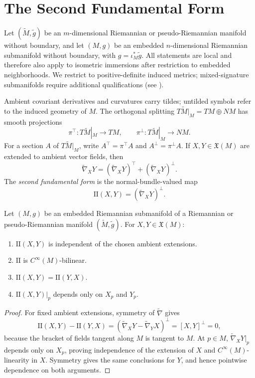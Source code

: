 \section{The Second Fundamental Form}

Let $(\widetilde M,\widetilde g)$ be an $m$-dimensional Riemannian or
pseudo-Riemannian manifold without boundary, and let $(M,g)$ be an embedded
$n$-dimensional Riemannian submanifold without boundary, with
$g=\iota_M^*\widetilde g$. All statements are local and therefore also apply
to isometric immersions after restriction to embedded neighborhoods. We
restrict to positive-definite induced metrics; mixed-signature submanifolds
require additional qualifications (see \cite{dC92}).

Ambient covariant derivatives and curvatures carry tildes; untilded symbols
refer to the induced geometry of $M$. The orthogonal splitting
$T\widetilde M|_M=TM\oplus NM$ has smooth projections
\[
\pi^\top:T\widetilde M|_M\to TM,
\qquad
\pi^\perp:T\widetilde M|_M\to NM.
\]
For a section $A$ of $T\widetilde M|_M$, write
$A^\top=\pi^\top A$ and $A^\perp=\pi^\perp A$. If
$X,Y\in\mathfrak X(M)$ are extended to ambient vector fields, then
\begin{equation}
\widetilde\nabla_XY
=(\widetilde\nabla_XY)^\top+(\widetilde\nabla_XY)^\perp.
\tag{8.1}
\end{equation}
The \emph{second fundamental form} is the normal-bundle-valued map
\[
\mathrm{II}(X,Y)=(\widetilde\nabla_XY)^\perp.
\]

\begin{proposition}
\label{prop:second-fundamental-form-properties}

Let $(M,g)$ be an embedded Riemannian submanifold of a Riemannian or
pseudo-Riemannian manifold $(\widetilde M,\widetilde g)$. For
$X,Y\in\mathfrak X(M)$:
\begin{enumerate}[label=(\alph*)]
\item $\mathrm{II}(X,Y)$ is independent of the chosen ambient extensions.
\item $\mathrm{II}$ is $C^\infty(M)$-bilinear.
\item $\mathrm{II}(X,Y)=\mathrm{II}(Y,X)$.
\item $\mathrm{II}(X,Y)|_p$ depends only on $X_p$ and $Y_p$.
\end{enumerate}
\end{proposition}

\begin{proof}
\sketch For fixed ambient extensions, symmetry of $\widetilde\nabla$ gives
\[
\mathrm{II}(X,Y)-\mathrm{II}(Y,X)
=(\widetilde\nabla_XY-\widetilde\nabla_YX)^\perp=[X,Y]^\perp=0,
\]
because the bracket of fields tangent along $M$ is tangent to $M$. At
$p\in M$, $\widetilde\nabla_XY|_p$ depends only on $X_p$, proving independence
of the extension of $X$ and $C^\infty(M)$-linearity in $X$. Symmetry gives the
same conclusions for $Y$, and hence pointwise dependence on both arguments.
\end{proof}

